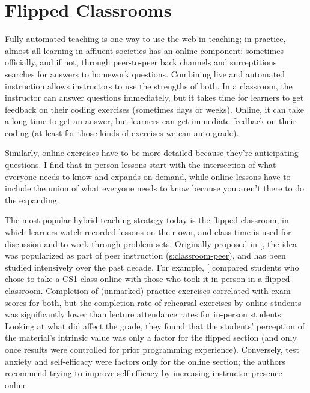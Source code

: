 \section{Flipped Classrooms}\label{s:online-flipped}

Fully automated teaching is one way to use the web in teaching; in
practice, almost all learning in affluent societies has an online
component: sometimes officially, and if not, through peer-to-peer back
channels and surreptitious searches for answers to homework questions.
Combining live and automated instruction allows instructors to use the
strengths of both. In a classroom, the instructor can answer questions
immediately, but it takes time for learners to get feedback on their
coding exercises (sometimes days or weeks). Online, it can take a long
time to get an answer, but learners can get immediate feedback on their
coding (at least for those kinds of exercises we can auto-grade).

Similarly, online exercises have to be more detailed because they're
anticipating questions. I find that in-person lessons start with the
intersection of what everyone needs to know and expands on demand, while
online lessons have to include the union of what everyone needs to know
because you aren't there to do the expanding.

The most popular hybrid teaching strategy today is the
\protect\hyperlink{g:flipped-classroom}{flipped classroom}, in which learners
watch recorded lessons on their own, and class time is used for
discussion and to work through problem sets. Originally proposed in
{[}\protect[\hyperlink{b:King1993}{King1993}]{]}, the idea was popularized as part of peer instruction
(\protect\hyperlink{SECTION}{s:classroom-peer}), and has been studied intensively over
the past decade. For example, {[}\protect[\hyperlink{b:Camp2016}{Camp2016}]{]} compared students who
chose to take a CS1 class online with those who took it in person in a
flipped classroom. Completion of (unmarked) practice exercises
correlated with exam scores for both, but the completion rate of
rehearsal exercises by online students was significantly lower than
lecture attendance rates for in-person students. Looking at what did
affect the grade, they found that the students' perception of the
material's intrinsic value was only a factor for the flipped section
(and only once results were controlled for prior programming
experience). Conversely, test anxiety and self-efficacy were factors
only for the online section; the authors recommend trying to improve
self-efficacy by increasing instructor presence online.


